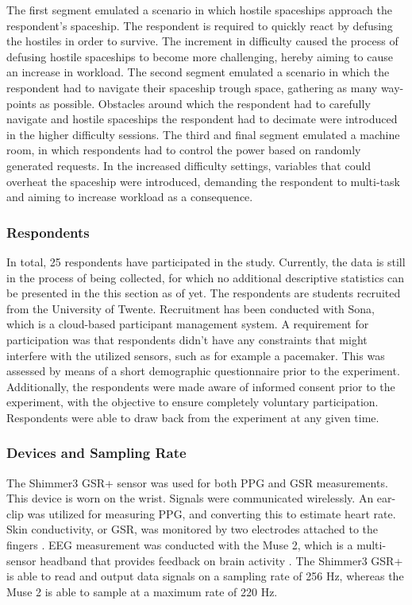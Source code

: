 \documentclass[12pt]{article}
\begin{document}
The first segment emulated a scenario in which hostile spaceships approach the respondent's spaceship. The respondent is required to quickly react by defusing the hostiles in order to survive. The increment in difficulty caused the process of defusing hostile spaceships to become more challenging, hereby aiming to cause an increase in workload. The second segment emulated a scenario in which the respondent had to navigate their spaceship trough space, gathering as many way-points as possible. Obstacles around which the respondent had to carefully navigate and hostile spaceships the respondent had to decimate were introduced in the higher difficulty sessions. The third and final segment emulated a machine room, in which respondents had to control the power based on randomly generated requests. In the increased difficulty settings, variables that could overheat the spaceship were introduced, demanding the respondent to multi-task and aiming to increase workload as a consequence.

\subsubsection{Respondents}
In total, 25 respondents have participated in the study. Currently, the data is still in the process of being collected, for which no additional descriptive statistics can be presented in the this section as of yet. The respondents are students recruited from the University of Twente. Recruitment has been conducted with Sona, which is a cloud-based participant management system. A requirement for participation was that respondents didn't have any constraints that might interfere with the utilized sensors, such as for example a pacemaker. This was assessed by means of a short demographic questionnaire prior to the experiment. Additionally, the respondents were made aware of informed consent prior to the experiment, with the objective to ensure completely voluntary participation. Respondents were able to draw back from the experiment at any given time. 

\subsubsection{Devices and Sampling Rate}
The Shimmer3 GSR+ sensor was used for both PPG and GSR measurements. This device is worn on the wrist. Signals were communicated wirelessly. An ear-clip was utilized for measuring PPG, and converting this to estimate heart rate. Skin conductivity, or GSR, was monitored by two electrodes attached to the fingers \cite{shimmer}. EEG measurement was conducted with the Muse 2, which is a multi-sensor headband that provides feedback on brain activity \cite{muse}. The Shimmer3 GSR+ is able to read and output data signals on a sampling rate of 256 Hz, whereas the Muse 2 is able to sample at a maximum rate of 220 Hz. 
\end{document}
